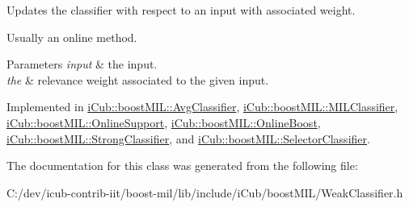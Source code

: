 Updates the classifier with respect to an input with associated weight. 

Usually an online method.


\begin{DoxyParams}{Parameters}
{\em input} & the input. \\
\hline
{\em the} & relevance weight associated to the given input. \\
\hline
\end{DoxyParams}


Implemented in \hyperlink{classiCub_1_1boostMIL_1_1AvgClassifier_ab6da9e17e44ee65c40b854b2d4ff4a52}{i\+Cub\+::boost\+M\+I\+L\+::\+Avg\+Classifier}, \hyperlink{classiCub_1_1boostMIL_1_1MILClassifier_a8417e89679c2e9f68cd3093e2de7ba7e}{i\+Cub\+::boost\+M\+I\+L\+::\+M\+I\+L\+Classifier}, \hyperlink{classiCub_1_1boostMIL_1_1OnlineSupport_a534fa475c6a1f492e05bd5cbcf858acb}{i\+Cub\+::boost\+M\+I\+L\+::\+Online\+Support}, \hyperlink{classiCub_1_1boostMIL_1_1OnlineBoost_a4309a08bf487eaaf911a1977deed8086}{i\+Cub\+::boost\+M\+I\+L\+::\+Online\+Boost}, \hyperlink{classiCub_1_1boostMIL_1_1StrongClassifier_aabb7f754e938b0529147e55d72c7a66c}{i\+Cub\+::boost\+M\+I\+L\+::\+Strong\+Classifier}, and \hyperlink{classiCub_1_1boostMIL_1_1SelectorClassifier_a8bb80c44b2cb9ef79eb066f2f08e5c4f}{i\+Cub\+::boost\+M\+I\+L\+::\+Selector\+Classifier}.



The documentation for this class was generated from the following file\+:\begin{DoxyCompactItemize}
\item 
C\+:/dev/icub-\/contrib-\/iit/boost-\/mil/lib/include/i\+Cub/boost\+M\+I\+L/Weak\+Classifier.\+h\end{DoxyCompactItemize}
